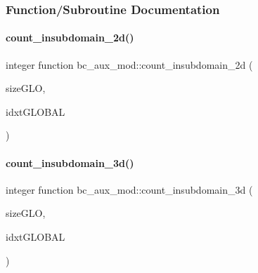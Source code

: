 \subsubsection{Function/\+Subroutine Documentation}
\mbox{\label{namespacebc__aux__mod_a04b336a053ee0b434aed95659a1c1eab}} 
\paragraph{\texorpdfstring{count\+\_\+insubdomain\+\_\+2d()}{count\_insubdomain\_2d()}}
{\footnotesize\ttfamily integer function bc\+\_\+aux\+\_\+mod\+::count\+\_\+insubdomain\+\_\+2d (\begin{DoxyParamCaption}\item[{integer, intent(in)}]{size\+G\+LO,  }\item[{integer, dimension(sizeglo), intent(in)}]{idxt\+G\+L\+O\+B\+AL }\end{DoxyParamCaption})}

\mbox{\label{namespacebc__aux__mod_ad07d86b4193104bf6371002e745c603e}} 
\paragraph{\texorpdfstring{count\+\_\+insubdomain\+\_\+3d()}{count\_insubdomain\_3d()}}
{\footnotesize\ttfamily integer function bc\+\_\+aux\+\_\+mod\+::count\+\_\+insubdomain\+\_\+3d (\begin{DoxyParamCaption}\item[{integer, intent(in)}]{size\+G\+LO,  }\item[{integer, dimension(sizeglo), intent(in)}]{idxt\+G\+L\+O\+B\+AL }\end{DoxyParamCaption})}

\mbox{\label{namespacebc__aux__mod_af1f153076dc7ab8e6f5843cd84dc8394}} 
